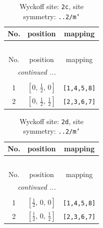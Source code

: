 \documentclass[fleqn,8pt]{jsarticle}
\begin{document}
\renewcommand{\arraystretch}{1.2}
\begin{longtable}{ccc}
\caption{Wyckoff site: {\tt 2c}, site symmetry: {\tt ..2/m'}}
 \\
 \hline \hline
No. & position & mapping \\ \hline \endfirsthead

\multicolumn{2}{l}{\tablename\ \thetable{}} \\
 \hline \hline
No. & position & mapping \\ \hline \endhead

 \hline \hline
\multicolumn{2}{r}{\footnotesize\it continued ...} \\ \endfoot

 \hline \hline
\multicolumn{2}{r}{} \\ \endlastfoot

1 & $\left[ 0,\, \frac{1}{2},\, 0 \right]$ & {\tt [1,4,5,8]} \\ \hline
2 & $\left[ 0,\, \frac{1}{2},\, \frac{1}{2} \right]$ & {\tt [2,3,6,7]} \\
\end{longtable}
\renewcommand{\arraystretch}{1.2}
\begin{longtable}{ccc}
\caption{Wyckoff site: {\tt 2d}, site symmetry: {\tt ..2/m'}}
 \\
 \hline \hline
No. & position & mapping \\ \hline \endfirsthead

\multicolumn{2}{l}{\tablename\ \thetable{}} \\
 \hline \hline
No. & position & mapping \\ \hline \endhead

 \hline \hline
\multicolumn{2}{r}{\footnotesize\it continued ...} \\ \endfoot

 \hline \hline
\multicolumn{2}{r}{} \\ \endlastfoot

1 & $\left[ \frac{1}{2},\, 0,\, 0 \right]$ & {\tt [1,4,5,8]} \\ \hline
2 & $\left[ \frac{1}{2},\, 0,\, \frac{1}{2} \right]$ & {\tt [2,3,6,7]} \\
\end{longtable}
\renewcommand{\arraystretch}{1.2}
\end{document}
